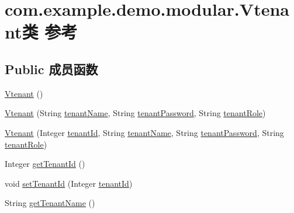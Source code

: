 \hypertarget{classcom_1_1example_1_1demo_1_1modular_1_1_vtenant}{}\section{com.\+example.\+demo.\+modular.\+Vtenant类 参考}
\label{classcom_1_1example_1_1demo_1_1modular_1_1_vtenant}
\subsection*{Public 成员函数}
\begin{DoxyCompactItemize}
\item 
\mbox{\hyperlink{classcom_1_1example_1_1demo_1_1modular_1_1_vtenant_aa6f3ffb3f3f6cf048af259117bb0fe8b}{Vtenant}} ()
\item 
\mbox{\hyperlink{classcom_1_1example_1_1demo_1_1modular_1_1_vtenant_a0c75347ad4d741b32dcfc779d43ac3b7}{Vtenant}} (String \mbox{\hyperlink{classcom_1_1example_1_1demo_1_1modular_1_1_vtenant_ae098be6ec95e07dfef7ca5dde2f2b6de}{tenant\+Name}}, String \mbox{\hyperlink{classcom_1_1example_1_1demo_1_1modular_1_1_vtenant_afdfb384c6cf40c07fa2a55b2c99129d1}{tenant\+Password}}, String \mbox{\hyperlink{classcom_1_1example_1_1demo_1_1modular_1_1_vtenant_ab11fe2c741cf1c5e88370cd851445ee3}{tenant\+Role}})
\item 
\mbox{\hyperlink{classcom_1_1example_1_1demo_1_1modular_1_1_vtenant_aeabfb67ac302b23c715a33efcdff5740}{Vtenant}} (Integer \mbox{\hyperlink{classcom_1_1example_1_1demo_1_1modular_1_1_vtenant_a63d3b1766ff9475911742f1c837ff8ee}{tenant\+Id}}, String \mbox{\hyperlink{classcom_1_1example_1_1demo_1_1modular_1_1_vtenant_ae098be6ec95e07dfef7ca5dde2f2b6de}{tenant\+Name}}, String \mbox{\hyperlink{classcom_1_1example_1_1demo_1_1modular_1_1_vtenant_afdfb384c6cf40c07fa2a55b2c99129d1}{tenant\+Password}}, String \mbox{\hyperlink{classcom_1_1example_1_1demo_1_1modular_1_1_vtenant_ab11fe2c741cf1c5e88370cd851445ee3}{tenant\+Role}})
\item 
Integer \mbox{\hyperlink{classcom_1_1example_1_1demo_1_1modular_1_1_vtenant_ade34f19a8a3d548d88aa82d83666e2fd}{get\+Tenant\+Id}} ()
\item 
void \mbox{\hyperlink{classcom_1_1example_1_1demo_1_1modular_1_1_vtenant_a67a97f46b48975280657801de7653a89}{set\+Tenant\+Id}} (Integer \mbox{\hyperlink{classcom_1_1example_1_1demo_1_1modular_1_1_vtenant_a63d3b1766ff9475911742f1c837ff8ee}{tenant\+Id}})
\item 
String \mbox{\hyperlink{classcom_1_1example_1_1demo_1_1modular_1_1_vtenant_a0e8b978b6e35728c50374bdbfc198c49}{get\+Tenant\+Name}} ()

\end{DoxyCompactItemize}
